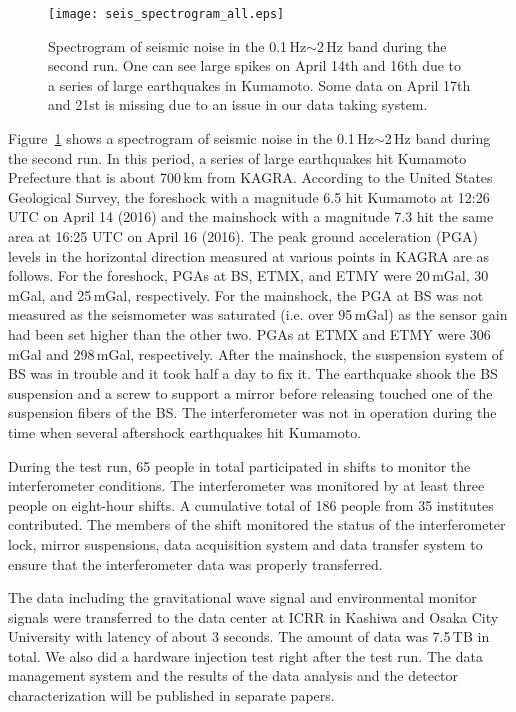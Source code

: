 \documentclass[prd ,twocolumn ,secnumarabic,dvips
,amssymb, amsmath,nobibnotes, aps, prd,superscriptaddress]{revtex4-1}
\begin{document}
{%
\begin{figure}[htbp]
	\begin{center}
		\texttt{[image: seis\_spectrogram\_all.eps]}
		\caption{\label{fig:spectrogram}Spectrogram of seismic noise in the 0.1\,Hz$\sim$2\,Hz band during the second run. One can see large spikes on April 14th and 16th due to a series of large earthquakes in Kumamoto. Some data on April 17th and 21st is missing due to an issue in our data taking system.}
	\end{center}
\end{figure}

Figure~\ref{fig:spectrogram} shows a spectrogram of seismic noise in the 0.1\,Hz$\sim$2\,Hz band during the second run. In this period, a series of large earthquakes hit Kumamoto Prefecture that is about 700\,km from KAGRA. According to the United States Geological Survey, the foreshock with a magnitude 6.5 hit Kumamoto at 12:26 UTC on April 14 (2016) and the mainshock with a magnitude 7.3 hit the same area at 16:25 UTC on April 16 (2016). The peak ground acceleration (PGA) levels in the horizontal direction measured at various points in KAGRA are as follows. For the foreshock, PGAs at BS, ETMX, and ETMY were 20\,mGal, 30\,mGal, and 25\,mGal, respectively. For the mainshock, the PGA at BS was not measured as the seismometer was saturated (i.e. over 95\,mGal) as the sensor gain had been set higher than the other two. PGAs at ETMX and ETMY were 306\,mGal and 298\,mGal, respectively. After the mainshock, the suspension system of BS was in trouble and it took half a day to fix it. The earthquake shook the BS suspension and a screw to support a mirror before releasing touched one of the suspension fibers of the BS. The interferometer was not in operation during the time when several aftershock earthquakes hit Kumamoto.


During the test run, 65 people in total participated in shifts to monitor the interferometer conditions. The interferometer was monitored by at least three people on eight-hour shifts. A cumulative total of 186 people from 35 institutes contributed. The members of the shift monitored the status of the interferometer lock, mirror suspensions, data acquisition system and data transfer system to ensure that the interferometer data was properly transferred.

The data including the gravitational wave signal and environmental monitor signals were transferred to the data center at ICRR in Kashiwa and Osaka City University with latency of about 3 seconds. The amount of data was 7.5\,TB in total. We also did a hardware injection test right after the test run. The data management system and the results of the data analysis and the detector characterization will be published in separate papers.

}
\end{document}
